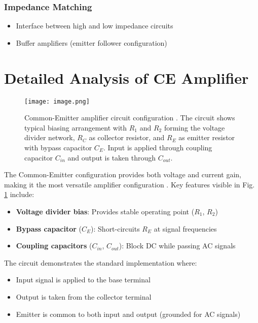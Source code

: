 \documentclass[conference]{IEEEtran}
\begin{document}
\subsubsection{Impedance Matching}
\begin{itemize}
    \item Interface between high and low impedance circuits
    \item Buffer amplifiers (emitter follower configuration)
\end{itemize}

\section{Detailed Analysis of CE Amplifier}

\begin{figure}[htbp]
\centering
\texttt{[image: image.png]}
\caption{Common-Emitter amplifier circuit configuration \cite{b1}. The circuit shows typical biasing arrangement with $R_1$ and $R_2$ forming the voltage divider network, $R_C$ as collector resistor, and $R_E$ as emitter resistor with bypass capacitor $C_E$. Input is applied through coupling capacitor $C_{in}$ and output is taken through $C_{out}$.}
\label{fig:ce_circuit}
\end{figure}

The Common-Emitter configuration provides both voltage and current gain, making it the most versatile amplifier configuration \cite{b2}. Key features visible in Fig. \ref{fig:ce_circuit} include:

\begin{itemize}
    \item \textbf{Voltage divider bias}: Provides stable operating point ($R_1$, $R_2$)
    \item \textbf{Bypass capacitor} ($C_E$): Short-circuits $R_E$ at signal frequencies
    \item \textbf{Coupling capacitors} ($C_{in}$, $C_{out}$): Block DC while passing AC signals
\end{itemize}

The circuit demonstrates the standard implementation where:
\begin{itemize}
    \item Input signal is applied to the base terminal
    \item Output is taken from the collector terminal
    \item Emitter is common to both input and output (grounded for AC signals)
\end{itemize}
\end{document}
